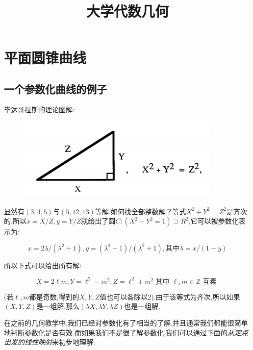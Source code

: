 \documentclass[UTF8]{book}
\begin{document}
\title{\centering\textbf{大学代数几何}}
\maketitle

\tableofcontents

\chapter{平面圆锥曲线}
	\section{一个参数化曲线的例子}
		毕达哥拉斯的理论图解:
	
		\begin{figure}[H]
			 \centering
			 \includegraphics[width=10cm]{9.jpg}\\
		\end{figure}
	
		显然有$  (3,4,5)  $与$ (5,12,13) $等解.如何找全部整数解？等式$X^{2}+Y^{2}=Z^{2}$是齐次的,所以$ x=X/Z,y=Y/Z $就给出了圆$ C:(X^{2}+Y^{2}=1) \supset R^{2}$,它可以被参数化表示为:
		
		\begin{equation*}
			x=2 \lambda /\left(\lambda^{2}+1\right), y=\left(\lambda^{2}-1\right) /\left(\lambda^{2}+1\right),其中\lambda=x /(1-y)
		\end{equation*}
		
		
		所以下式可以给出所有解:
		
		
		\begin{equation*}
			X=2 \ell m, Y=\ell^{2}-m^{2}, Z=\ell^{2}+m^{2}\text { 其中 }\ell, m \in \mathbb{Z} \text { 互素 }
		\end{equation*}
	
	
		(若$ \ell,m $都是奇数,得到的$ X,Y,Z $值也可以各除以2).由于该等式为齐次,所以如果$ (X,Y,Z) $是一组解,那么$ (\lambda X,\lambda Y,\lambda Z) $也是一组解.
		
		
		在之前的几何教学中,我们已经对参数化有了相当的了解,并且通常我们都能很简单地判断参数化是否有效.而如果我们不是很了解参数化,我们可以通过下面的\textit{从定点出发的线性映射}来初步地理解:
	
\end{document}
